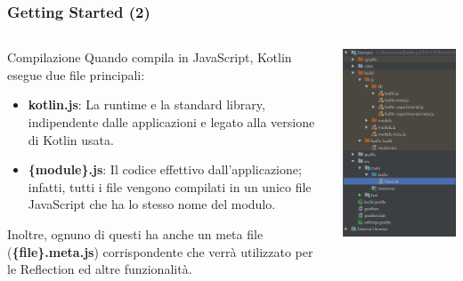     \begin{frame}
      \frametitle{Getting Started (2)}
      \begin{columns}
        \begin{column}{0.47\textwidth}
          \begin{block}{Compilazione}
            Quando compila in JavaScript, Kotlin esegue due file principali:
            \begin{itemize}
              \item \textbf{kotlin.js}: La runtime e la standard library, indipendente dalle applicazioni e legato
              alla versione di Kotlin usata.
              \item \textbf{\{module\}.js}: Il codice effettivo dall'applicazione; infatti, tutti i file vengono compilati
              in un unico file JavaScript che ha lo stesso nome del modulo.
            \end{itemize}
            Inoltre, ognuno di questi ha anche un meta file (\textbf{\{file\}.meta.js}) corrispondente che verrà
            utilizzato per le Reflection ed altre funzionalità.
          \end{block}
        \end{column}
        \begin{column}{0.5\textwidth}
          \begin{center}
            \includegraphics[scale=0.5]{ProjectStructure}
          \end{center}
        \end{column}
      \end{columns}

    \end{frame}

